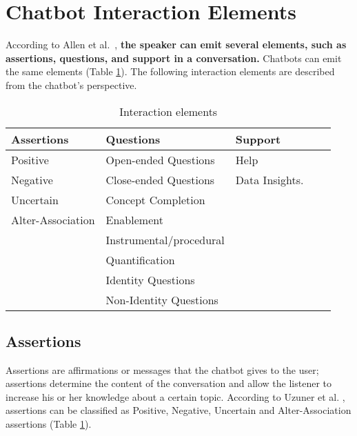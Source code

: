 \documentclass[a4paper,10pt]{article}
\begin{document}
\section{Chatbot Interaction Elements}
According to Allen et al.~\cite{allen1978conversation}, \textbf{the speaker can emit several elements, such as assertions, questions, and support in a conversation.} Chatbots can emit the same elements (Table \ref{InteractionElementsTable}). The following interaction elements are described from the chatbot's perspective. 


\begin{table}[]
\centering
\begin{tabular}{lllll}
\hline
\textbf{Assertions}    & \textbf{Questions}     & \textbf{Support}   \\
\hline
Positive & Open-ended Questions & Help      \\
Negative         &   Close-ended Questions       & Data Insights.  \\
Uncertain             &   Concept Completion      &       \\
Alter-Association                    &   Enablement    &       \\
                       &  Instrumental/procedural  &       \\    
                     & Quantification  &       \\    
                       & Identity Questions  &       \\    
                      &  Non-Identity Questions  &       \\    
     \hline                   
\end{tabular}
\caption{Interaction elements}
\label{InteractionElementsTable}
\end{table}

\subsection{Assertions}
Assertions are affirmations or messages that the chatbot gives to the user; assertions determine the content of the conversation and allow the listener to increase his or her knowledge about a certain topic. According to Uzuner et al. \cite{uzuner2009machine}, assertions can be classified as Positive, Negative, Uncertain and Alter-Association assertions (Table \ref{InteractionElementsTable}).  
\end{document}
